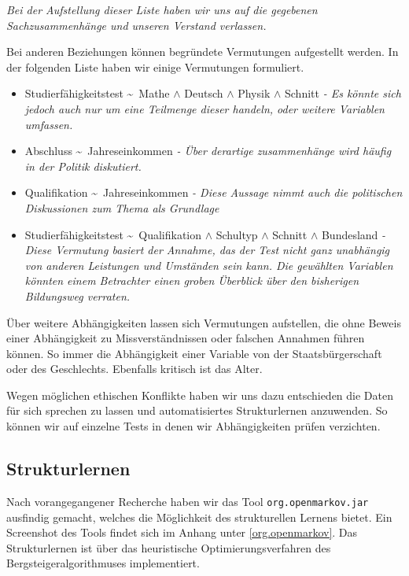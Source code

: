 \textit{Bei der Aufstellung dieser Liste haben wir uns auf die gegebenen Sachzusammenhänge und unseren Verstand verlassen.}

Bei anderen Beziehungen können begründete Vermutungen aufgestellt werden. In der folgenden Liste haben wir einige Vermutungen formuliert.

\begin{itemize}
	\item Studierfähigkeitstest \textasciitilde \ Mathe $\wedge$ Deutsch $\wedge$ Physik $\wedge$ Schnitt \textit{ - Es könnte sich jedoch auch nur um eine Teilmenge dieser handeln, oder weitere Variablen umfassen.}
	\item Abschluss \textasciitilde \ Jahreseinkommen \textit{ - Über derartige zusammenhänge wird häufig in der Politik diskutiert.}
	\item Qualifikation \textasciitilde  \ Jahreseinkommen \textit{ - Diese Aussage nimmt auch die politischen Diskussionen zum Thema als Grundlage}
	\item Studierfähigkeitstest \textasciitilde \  Qualifikation $\wedge$ Schultyp $\wedge$ Schnitt $\wedge$ Bundesland \textit{ - Diese Vermutung basiert der Annahme, das der Test nicht ganz unabhängig von anderen Leistungen und Umständen sein kann. Die gewählten Variablen könnten einem Betrachter einen groben Überblick über den bisherigen Bildungsweg verraten.}
\end{itemize}

Über weitere Abhängigkeiten lassen sich Vermutungen aufstellen, die ohne Beweis einer Abhängigkeit zu Missverständnissen oder falschen Annahmen führen können. So immer die Abhängigkeit einer Variable von der Staatsbürgerschaft oder des Geschlechts. Ebenfalls kritisch ist das Alter. 

Wegen möglichen ethischen Konflikte haben wir uns dazu entschieden die Daten für sich sprechen zu lassen und automatisiertes Strukturlernen anzuwenden. So können wir auf einzelne Tests in denen wir Abhängigkeiten prüfen verzichten. 

\subsection{Strukturlernen}
Nach vorangegangener Recherche haben wir das Tool \lstinline{org.openmarkov.jar} ausfindig gemacht, welches die Möglichkeit des strukturellen Lernens bietet. Ein Screenshot des Tools findet sich im Anhang unter \ref{org.openmarkov}. Das Strukturlernen ist über das heuristische Optimierungsverfahren des Bergsteigeralgorithmuses implementiert. 

